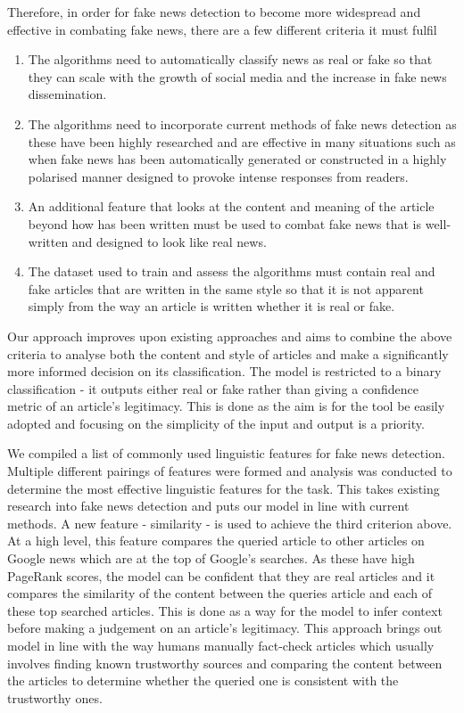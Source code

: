 \documentclass{article}
\begin{document}
Therefore, in order for fake news detection to become more widespread and effective in combating fake news, there are a few different criteria it must fulfil

\begin{enumerate}
  \item The algorithms need to automatically classify news as real or fake so that they can scale with the growth of social media and the increase in fake news dissemination.
  \item The algorithms need to incorporate current methods of fake news detection as these have been highly researched and are effective in many situations such as when fake news has been automatically generated or constructed in a highly polarised manner designed to provoke intense responses from readers.
  \item An additional feature that looks at the content and meaning of the article beyond how has been written must be used to combat fake news that is well-written and designed to look like real news.
  \item The dataset used to train and assess the algorithms must contain real and fake articles that are written in the same style so that it is not apparent simply from the way an article is written whether it is real or fake.
\end{enumerate}

Our approach improves upon existing approaches and aims to combine the above criteria to analyse both the content and style of articles and make a significantly more informed decision on its classification. The model is restricted to a binary classification - it outputs either real or fake rather than giving a confidence metric of an article's legitimacy. This is done as the aim is for the tool be easily adopted and focusing on the simplicity of the input and output is a priority.

We compiled a list of commonly used linguistic features for fake news detection. Multiple different pairings of features were formed and analysis was conducted to determine the most effective linguistic features for the task. This takes existing research into fake news detection and puts our model in line with current methods. A new feature - similarity - is used to achieve the third criterion above. At a high level, this feature compares the queried article to other articles on Google news which are at the top of Google's searches. As these have high PageRank scores, the model can be confident that they are real articles and it compares the similarity of the content between the queries article and each of these top searched articles. This is done as a way for the model to infer context before making a judgement on an article's legitimacy. This approach brings out model in line with the way humans manually fact-check articles which usually involves finding known trustworthy sources and comparing the content between the articles to determine whether the queried one is consistent with the trustworthy ones.
\end{document}
